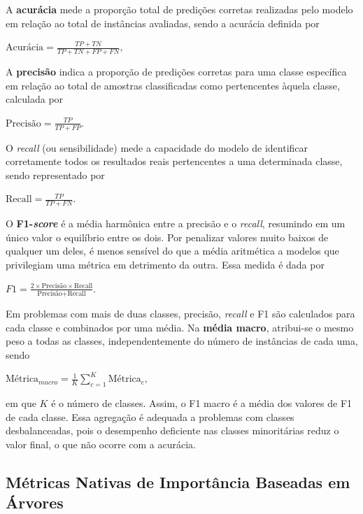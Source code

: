 A \textbf{acurácia} mede a proporção total de predições corretas realizadas pelo modelo em relação ao total de instâncias avaliadas, sendo a acurácia definida por
\begin{center}
	$\displaystyle \text{Acurácia} = \frac{TP + TN}{TP + TN + FP + FN},$
\end{center}

A \textbf{precisão} indica a proporção de predições corretas para uma classe específica em relação ao total de amostras classificadas como pertencentes àquela classe, calculada por
\begin{center}
	$\displaystyle \text{Precisão} = \frac{TP}{TP + FP}.$
\end{center}

O \textit{recall} (ou sensibilidade) mede a capacidade do modelo de identificar corretamente todos os resultados reais pertencentes a uma determinada classe, sendo representado por
\begin{center}
	$\displaystyle \text{Recall} = \frac{TP}{TP + FN}.$
\end{center}

O \textbf{F1-\textit{score}} é a média harmônica entre a precisão e o \textit{recall}, resumindo em um único valor o equilíbrio entre os dois. Por penalizar valores muito baixos de qualquer um deles, é menos sensível do que a média aritmética a modelos que privilegiam uma métrica em detrimento da outra. Essa medida é dada por
\begin{center}
	$\displaystyle F1 = \frac{2 \times \text{Precisão} \times \text{Recall}}{\text{Precisão} + \text{Recall}}.$
\end{center}

Em problemas com mais de duas classes, precisão, \textit{recall} e F1 são calculados para cada classe e combinados por uma média. Na \textbf{média macro}, atribui-se o mesmo peso a todas as classes, independentemente do número de instâncias de cada uma, sendo
\begin{center}
	$\displaystyle \text{Métrica}_{macro} = \frac{1}{K} \sum_{c=1}^{K} \text{Métrica}_c,$
\end{center}
em que $K$ é o número de classes. Assim, o F1 macro é a média dos valores de F1 de cada classe. Essa agregação é adequada a problemas com classes desbalanceadas, pois o desempenho deficiente nas classes minoritárias reduz o valor final, o que não ocorre com a acurácia.

\subsection{Métricas Nativas de Importância Baseadas em Árvores}


